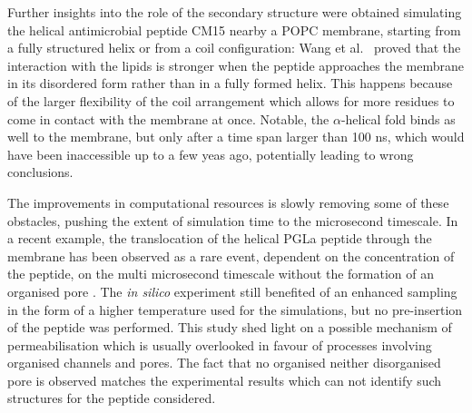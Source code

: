 Further insights into the role of the secondary structure were obtained simulating the helical antimicrobial peptide CM15 nearby a POPC membrane, starting from a fully structured helix or from a coil configuration: Wang et al.\ \cite{Wang2012} proved that the interaction with the lipids is stronger when the peptide approaches the membrane in its disordered form rather than in a fully formed helix. This happens because of the larger flexibility of the coil arrangement which allows for more residues to come in contact with the membrane at once. Notable, the $\alpha$-helical fold binds as well to the membrane, but only after a time span larger than 100 ns, which would have been inaccessible up to a few yeas ago, potentially leading to wrong conclusions.

The improvements in computational resources is slowly removing some of these obstacles, pushing the extent of simulation time to the microsecond timescale.
%
In a recent example, the translocation of the helical PGLa peptide through the membrane has been observed as a rare event, dependent on the concentration of the peptide, on the multi microsecond timescale without the formation of an organised pore \cite{Ulmschneider2017}. The \emph{in silico} experiment still benefited of an enhanced sampling in the form of a higher temperature used for the simulations, but no pre-insertion of the peptide was performed.  This study shed light on a possible mechanism of permeabilisation which is usually overlooked in favour of processes involving organised channels and pores. The fact that no organised neither disorganised pore is observed matches the experimental results which can not identify such structures for the peptide considered. 


